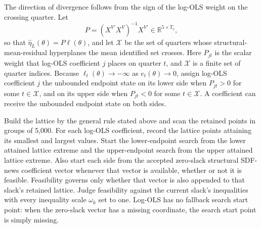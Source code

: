 \documentclass[11pt]{article}
\begin{document}
The direction of divergence follows from the sign of the log-OLS weight on the crossing quarter. Let
\begin{equation*}
 P=(X^{V\prime}X^V)^{-1}X^{V\prime}\in\mathbb R^{5\times T_v},
\end{equation*}
so that \(\widehat\eta_L(\theta)=P\ell(\theta)\), and let \(\mathcal X\) be the set of quarters whose
structural-mean-residual hyperplanes the mean identified set crosses. Here \(P_{jt}\) is the scalar
weight that log-OLS coefficient \(j\) places on quarter \(t\), and \(\mathcal X\) is a finite set of
quarter indices. Because \(\ell_t(\theta)\to-\infty\) as \(e_t(\theta)\to0\), assign log-OLS
coefficient \(j\) the unbounded endpoint state on its lower side when \(P_{jt}>0\) for some
\(t\in\mathcal X\), and on its upper side when \(P_{jt}<0\) for some \(t\in\mathcal X\). A
coefficient can receive the unbounded endpoint state on both sides.

Build the lattice by the general rule stated above and scan the retained points in groups of 5,000.
For each log-OLS coefficient, record the lattice points attaining its smallest and largest values.
Start the lower-endpoint search from the lower attained lattice extreme and the upper-endpoint search from the
upper attained lattice extreme. Also start each side from the accepted zero-slack structural SDF-news
coefficient vector whenever that vector is available, whether or not it is feasible. Feasibility
governs only whether that vector is also appended to that slack's retained lattice. Judge feasibility
against the current slack's inequalities with every inequality scale \(\omega_k\) set to one. Log-OLS
has no fallback search start point: when the zero-slack vector has a missing coordinate, the search
start point is simply missing.
\end{document}
